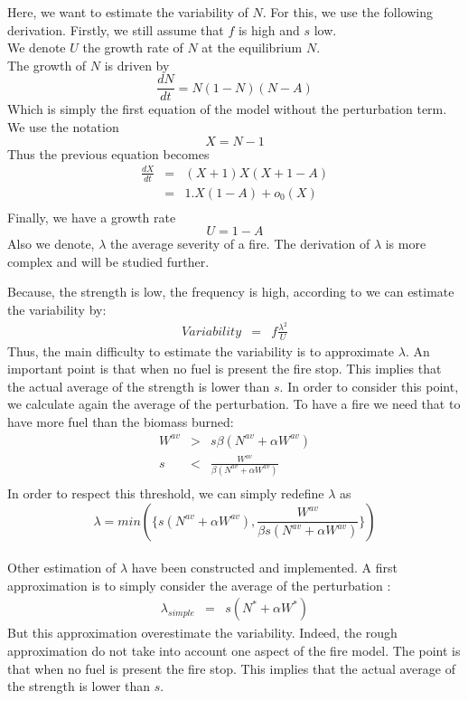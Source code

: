 \documentclass{article}
\begin{document}
Here, we want to estimate the variability of $N$. For this, we use the following derivation.
Firstly, we still assume that $f$ is high and $s$ low. 
\\
We denote $U$ the growth rate of $N$ at the equilibrium $N$. \\
The growth of $N$ is driven by  
\[
\frac{dN}{dt} = N(1-N)(N-A)
\]
Which is simply the first equation of the model without the perturbation term.
We use the notation
\[
X = N-1
\]
Thus the previous equation becomes
\[
\begin{array}{rcl}
\frac{dX}{dt} & = & (X+1)X(X+1-A) \\
& = & 1.X(1-A) + o_0(X) \\
\end{array}
\]
Finally, we have a growth rate 
\[
U = 1-A
\]
Also we denote, $\lambda$ the average severity of a fire. The derivation of $\lambda$ is more complex and will be studied further.

Because, the strength is low, the frequency is high, according to \cite{zelnik2018impact} we can estimate the variability by: 
\[
\begin{array}{rcl}
Variability & = & f\frac{\lambda^2}{U}
\end{array}
\]
Thus, the main difficulty to estimate the variability is to approximate $\lambda$. An important point is that when no fuel is present the fire stop. This implies that the actual average of the strength is lower than $s$. In order to consider this point, we calculate again the average of the perturbation. To have a fire we need that to have more fuel than the biomass burned:
\[
\begin{array}{rcl}
W^{av} & > & s\beta(N^{av}+\alpha W^{av}) \\
s & < & \frac{W^{av}}{\beta(N^{av}+\alpha W^{av})} \\
\end{array}
\]
In order to respect this threshold, we can simply redefine $\lambda$ as 
\[
\lambda = min(\{s(N^{av}+\alpha W^{av}), \frac{W^{av}}{\beta s (N^{av}+\alpha W^{av})}\})
\]


\paragraph{}
Other estimation of $\lambda$ have been constructed and implemented. A first approximation is to simply consider the average of the perturbation : 
\[
\begin{array}{rcl}
\lambda_{simple} & = & s(N^*+\alpha W^*)
\end{array}
\]
But this approximation overestimate the variability. Indeed, the rough approximation do not take into account one aspect of the fire model. The point is that when no fuel is present the fire stop. This implies that the actual average of the strength is lower than $s$.
\end{document}
